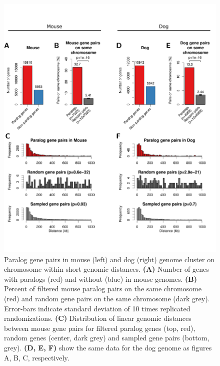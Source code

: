 \documentclass[a4paper,twoside=true,openright,parskip=full,chapterprefix=true,11pt,headings=normal,bibliography=totoc,listof=totoc,titlepage=on,captions=tableabove,draft=false]{scrreprt}
\theoremstyle{definition}
\theoremstyle{definition}
\theoremstyle{definition}
\theoremstyle{remark}
\begin{document}
\begin{figure}

{\centering \includegraphics[width=0.5\linewidth]{figures/paralog/SI/figS11} 

}

\caption{Paralog gene pairs in mouse (left) and dog (right)
genome cluster on chromosome within short genomic distances.
\textbf{(A)} Number of genes with paralogs (red) and without (blue) in
mouse genomes. \textbf{(B)} Percent of filtered mouse paralog pairs on
the same chromosome (red) and random gene pairs on the same chromosome
(dark grey). Error-bars indicate standard deviation of 10 times
replicated randomizations. \textbf{(C)} Distribution of linear genomic
distances between mouse gene pairs for filtered paralog genes (top,
red), random genes (center, dark grey) and sampled gene pairs (bottom,
grey). \textbf{(D, E, F)} show the same data for the dog genome as
figures A, B, C, respectively.}\label{fig:paralogsSpecies}
\end{figure}
\end{document}
